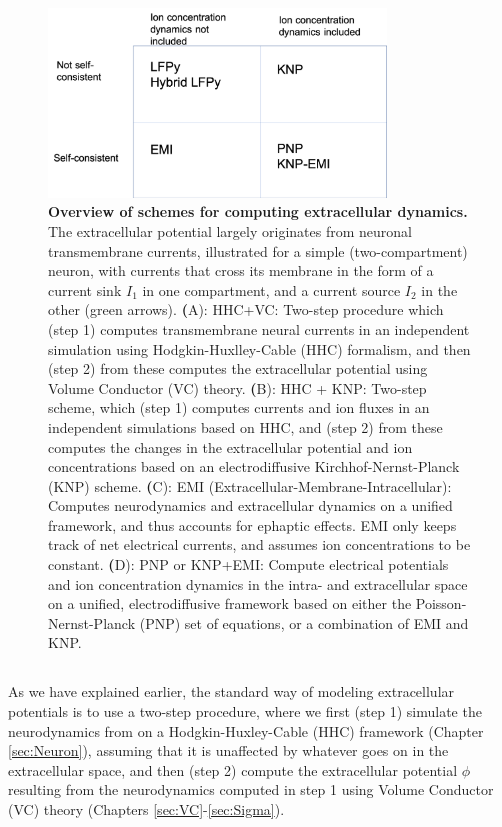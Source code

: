 \begin{figure}[!ht]
\begin{center}
\includegraphics[width=0.8\textwidth]{Figures/Schemes/schemes.png}
\end{center}
\caption{\textbf{Overview of schemes for computing extracellular dynamics.} The extracellular potential largely originates from neuronal transmembrane currents, illustrated for a simple (two-compartment) neuron, with currents that cross its membrane in the form of a current sink $I_1$ in one compartment, and a current source $I_2$ in the other (green arrows). {\textbf (A)}: HHC+VC: Two-step procedure which (step 1) computes transmembrane neural currents in an independent simulation using Hodgkin-Huxlley-Cable (HHC) formalism, and then (step 2) from these computes the extracellular potential using Volume Conductor (VC) theory. {\textbf (B)}: HHC + KNP: Two-step scheme, which (step 1) computes currents and ion fluxes in an independent simulations based on HHC, and (step 2) from these computes the changes in the extracellular potential and ion concentrations based on an electrodiffusive Kirchhof-Nernst-Planck (KNP) scheme. {\textbf (C)}: EMI (Extracellular-Membrane-Intracellular): Computes neurodynamics and extracellular dynamics on a unified framework, and thus accounts for ephaptic effects. EMI only keeps track of net electrical currents, and assumes ion concentrations to be constant. {\textbf (D)}: PNP or KNP+EMI: Compute electrical potentials and ion concentration dynamics in the intra- and extracellular space on a unified, electrodiffusive framework based on either the Poisson-Nernst-Planck (PNP) set of equations, or a combination of EMI and KNP. 
}
\label{Schemes:fig:schemes}
\end{figure}


\subsection{}
As we have explained earlier, the standard way of modeling extracellular potentials is to use a two-step procedure, where we first (step 1) simulate the neurodynamics from on a Hodgkin-Huxley-Cable (HHC) framework (Chapter \ref{sec:Neuron}), assuming that it is unaffected by whatever goes on in the extracellular space, and then (step 2) compute the extracellular potential $\phi$ resulting from the neurodynamics computed in step 1 using Volume Conductor (VC) theory (Chapters \ref{sec:VC}-\ref{sec:Sigma}). 

